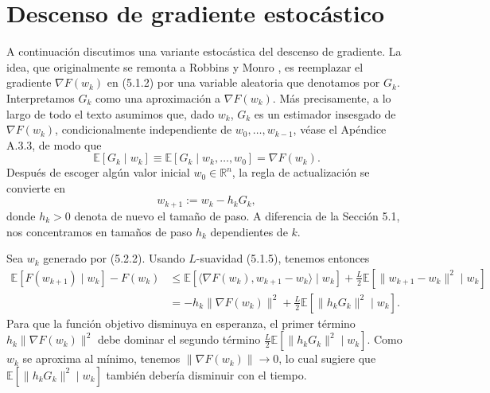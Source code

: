 \documentclass[11pt]{report}
\theoremstyle{definition}
\theoremstyle{plain}
\numberwithin{equation}{section}
\begin{document}
\section{Descenso de gradiente estocástico}

A continuación discutimos una variante estocástica del descenso de gradiente. La idea, que originalmente se remonta a Robbins y Monro \cite{robbins-monro-1951}, es reemplazar el gradiente \(\nabla F(w_k)\) en (5.1.2) por una variable aleatoria que denotamos por \(G_k\). Interpretamos \(G_k\) como una aproximación a \(\nabla F(w_k)\). Más precisamente, a lo largo de todo el texto asumimos que, dado \(w_k\), \(G_k\) es un estimador insesgado de \(\nabla F(w_k)\), condicionalmente independiente de \(w_0,\ldots,w_{k-1}\), véase el Apéndice A.3.3, de modo que
\begin{equation*}
    \mathbb{E}[G_k\mid w_k]
    \equiv
    \mathbb{E}[G_k\mid w_k,\ldots,w_0]
    =
    \nabla F(w_k).
    \tag{5.2.1}
\end{equation*}
Después de escoger algún valor inicial \(w_0\in\mathbb{R}^n\), la regla de actualización se convierte en
\begin{equation*}
    w_{k+1}:=w_k-h_kG_k,
    \tag{5.2.2}
\end{equation*}
donde \(h_k>0\) denota de nuevo el tamaño de paso. A diferencia de la Sección 5.1, nos concentramos en tamaños de paso \(h_k\) dependientes de \(k\).

Sea \(w_k\) generado por (5.2.2). Usando \(L\)-suavidad (5.1.5), tenemos entonces \cite[Lema 4.2]{bottou-curtis-nocedal-2018}
\begin{align*}
    \mathbb{E}[F(w_{k+1})\mid w_k]-F(w_k)
    &\leq
    \mathbb{E}[
        \langle\nabla F(w_k),w_{k+1}-w_k\rangle
        \mid w_k
    ]
    +
    \frac{L}{2}\mathbb{E}[
        \|w_{k+1}-w_k\|^2
        \mid w_k
    ]\\
    &=
    -h_k\|\nabla F(w_k)\|^2
    +
    \frac{L}{2}\mathbb{E}[\|h_kG_k\|^2\mid w_k].
\end{align*}
Para que la función objetivo disminuya en esperanza, el primer término \(h_k\|\nabla F(w_k)\|^2\) debe dominar el segundo término \(\frac{L}{2}\mathbb{E}[\|h_kG_k\|^2\mid w_k]\). Como \(w_k\) se aproxima al mínimo, tenemos \(\|\nabla F(w_k)\|\to0\), lo cual sugiere que \(\mathbb{E}[\|h_kG_k\|^2\mid w_k]\) también debería disminuir con el tiempo.
\end{document}
